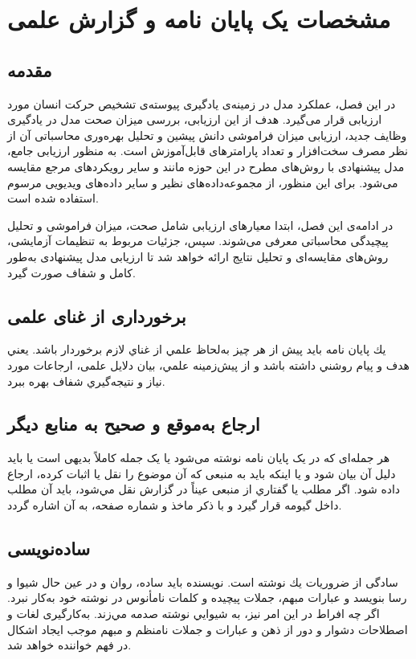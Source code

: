 \chapter{مشخصات یک پایان نامه و گزارش علمی}
\section{مقدمه}
در این فصل، عملکرد مدل  در زمینه‌ی یادگیری پیوسته‌ی تشخیص حرکت انسان مورد ارزیابی قرار می‌گیرد. هدف از این ارزیابی، بررسی میزان صحت مدل در یادگیری وظایف جدید، ارزیابی میزان فراموشی دانش پیشین و تحلیل بهره‌وری محاسباتی آن از نظر مصرف سخت‌افزار و تعداد پارامترهای قابل‌آموزش است. به منظور ارزیابی جامع، مدل پیشنهادی با روش‌های مطرح در این حوزه مانند  و سایر رویکردهای مرجع مقایسه می‌شود. برای این منظور، از مجموعه‌داده‌های نظیر  و سایر داده‌های ویدیویی مرسوم استفاده شده است.

در ادامه‌ی‌ این فصل، ابتدا معیارهای ارزیابی شامل صحت، میزان فراموشی و تحلیل پیچیدگی محاسباتی معرفی می‌شوند. سپس، جزئیات مربوط به تنظیمات آزمایشی، روش‌های مقایسه‌ای و تحلیل نتایج ارائه خواهد شد تا ارزیابی مدل پیشنهادی به‌طور کامل و شفاف صورت گیرد.

\section{برخورداری از غنای علمی }

يك پایان نامه بايد پیش از هر چيز به‌لحاظ علمي از غناي لازم برخوردار باشد. يعني هدف و پيام روشني داشته باشد و از پيش‌زمينه علمي، بيان دلايل علمی، ارجاعات مورد نیاز و نتيجه‌گيري شفاف بهره ببرد. 

\section{ارجاع به‌موقع و صحیح به منابع دیگر}
هر جمله‌ای که در یک پایان نامه نوشته می‌شود یا یک جمله کاملاً بدیهی است یا باید دلیل آن بیان شود و یا اینکه باید به منبعی که آن موضوع را نقل یا اثبات کرده، ارجاع داده شود. اگر مطلب يا گفتاري از منبعی عيناً در گزارش نقل مي‌شود، بايد آن مطلب داخل گيومه قرار گيرد و با ذكر ماخذ و شماره صفحه، به آن اشاره گردد.


\section{ساده‌نویسی }
سادگی از ضروريات يك نوشته است. نويسنده بايد ساده، روان و در عين حال شيوا و رسا بنويسد و عبارات مبهم، جملات پيچيده و كلمات نامأنوس در نوشته خود به‌كار نبرد. اگر چه افراط در اين امر نيز، به شيوايي نوشته صدمه مي‌زند. به‌كارگیری لغات و اصطلاحات دشوار و دور از ذهن و عبارات و جملات نامنظم و مبهم موجب ايجاد اشكال در فهم خواننده خواهد شد‌. 

